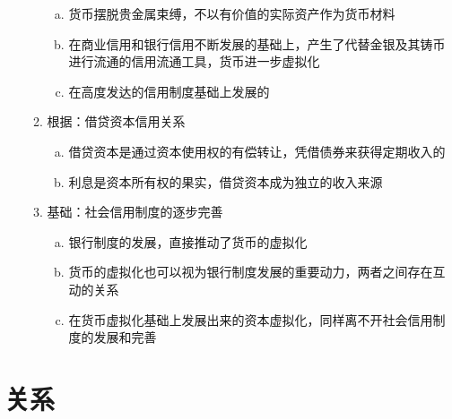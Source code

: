 \documentclass[12pt]{book}
\begin{document}
\begin{enumerate}[1.]
\begin{enumerate}[(1)]
\begin{enumerate}[a.]
                        \item 货币摆脱贵金属束缚，不以有价值的实际资产作为货币材料
                        \item 在商业信用和银行信用不断发展的基础上，产生了代替金银及其铸币进行流通的信用流通工具，货币进一步虚拟化
                        \item 在高度发达的信用制度基础上发展的
                    \end{enumerate}
              \item 根据：借贷资本信用关系
                    \begin{enumerate}[a.]
                        \item 借贷资本是通过资本使用权的有偿转让，凭借债券来获得定期收入的
                        \item 利息是资本所有权的果实，借贷资本成为独立的收入来源
                    \end{enumerate}
              \item 基础：社会信用制度的逐步完善
                    \begin{enumerate}[a.]
                        \item 银行制度的发展，直接推动了货币的虚拟化
                        \item 货币的虚拟化也可以视为银行制度发展的重要动力，两者之间存在互动的关系
                        \item 在货币虚拟化基础上发展出来的资本虚拟化，同样离不开社会信用制度的发展和完善
                    \end{enumerate}

          \end{enumerate}
\end{enumerate}




\section{关系}
\end{document}
